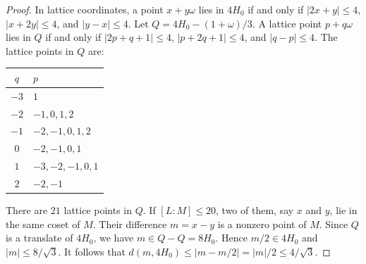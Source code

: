 \documentclass[10pt,a4paper]{amsart}
\begin{document}
\begin{proof}
In lattice coordinates, a point $x+y\omega$ lies in $4H_0$ if and only if $|2x+y|\le4$, $|x+2y|\le4$, and $|y-x|\le4$. Let $Q=4H_0-(1+\omega)/3$. A lattice point $p+q\omega$ lies in $Q$ if and only if $|2p+q+1|\le4$, $|p+2q+1|\le4$, and $|q-p|\le4$.
The lattice points in $Q$ are:

\begin{center}
\begin{tabular}{c|l}
$q$ & $p$ \\ \hline
$-3$ & $1$ \\
$-2$ & $-1,0,1,2$ \\
$-1$ & $-2,-1,0,1,2$ \\
$0$ & $-2,-1,0,1$ \\
$1$ & $-3,-2,-1,0,1$ \\
$2$ & $-2,-1$
\end{tabular}
\end{center}

There are $21$ lattice points in $Q$. If $[L:M]\le20$, two of them, say $x$ and $y$, lie in the same coset of $M$. Their difference $m=x-y$ is a nonzero point of $M$. Since $Q$ is a translate of $4H_0$, we have $m\in Q-Q=8H_0$. Hence $m/2\in4H_0$ and $|m|\le8/\sqrt3$. It follows that $d(m,4H_0)\le|m-m/2|=|m|/2\le4/\sqrt3$.
\end{proof}
\end{document}
